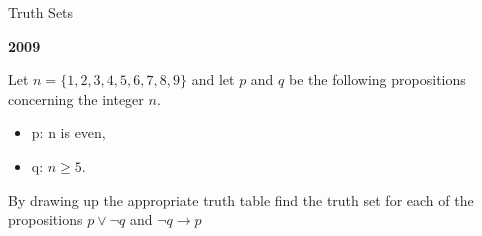 \documentclass{beamer}
\begin{document}
\begin{frame}
{Truth Sets}


\textbf{2009} 

Let $n = \{1, 2,3,4, 5,6,7, 8, 9\}$ and let $p$ and  $q$ be the following propositions concerning the integer $n$.
\begin{itemize}
\item p: n is even, 
\item q: $n\geq 5$.
\end{itemize}
By drawing up the appropriate truth table ﬁnd the truth set for each of the
propositions $p \vee \neg q$ and $ \neg q \rightarrow p$
\end{frame}
\end{document}
